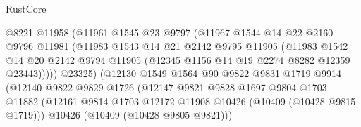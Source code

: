 \begin{lexlean}{RustCore}
\begin{coremodule}
                                  @8221
                                  @11958
                                  (@11961
                                    @1545
                                    @23
                                    @9797
                                    (@11967
                                      @1544
                                      @14
                                      @22
                                      @2160
                                      @9796
                                      @11981
                                      (@11983
                                        @1543
                                        @14
                                        @21
                                        @2142
                                        @9795
                                        @11905
                                        (@11983
                                          @1542
                                          @14
                                          @20
                                          @2142
                                          @9794
                                          @11905
                                          (@12345 @1156 @14 @19 @2274 @8282 @12359 @23443)))))
                                  @23325)
                                (@12130
                                  @1549
                                  @1564
                                  @90
                                  @9822
                                  @9831
                                  @1719
                                  @9914
                                  (@12140
                                    @9822
                                    @9829
                                    @1726
                                    (@12147
                                      @9821
                                      @9828
                                      @1697
                                      @9804
                                      @1703
                                      @11882
                                      (@12161
                                        @9814
                                        @1703
                                        @12172
                                        @11908
                                        @10426
                                        (@10409 (@10428 @9815 @1719)))
                                      @10426
                                      (@10409 (@10428 @9805 @9821)))

\end{coremodule}
\end{lexlean}
